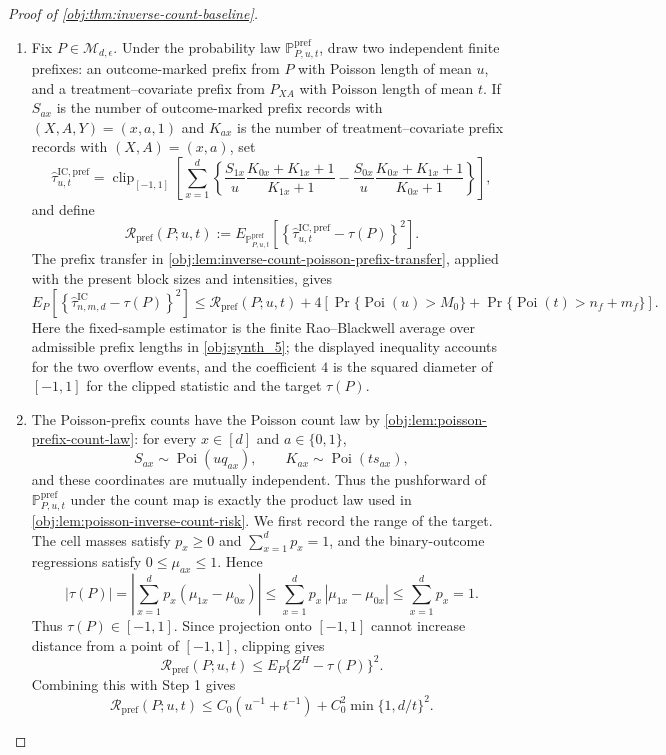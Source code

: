 \documentclass[11pt]{article}
\begin{document}
\begin{proof}[Proof of \cref{obj:thm:inverse-count-baseline}]
\begin{enumerate}
\item Fix \(P\in\mathcal M_{d,\epsilon}\).  Under the probability law \(\mathbb P^{\mathrm{pref}}_{P,u,t}\), draw two independent finite prefixes: an outcome-marked prefix from \(P\) with Poisson length of mean \(u\), and a treatment--covariate prefix from \(P_{XA}\) with Poisson length of mean \(t\).  If \(S_{ax}\) is the number of outcome-marked prefix records with \((X,A,Y)=(x,a,1)\) and \(K_{ax}\) is the number of treatment--covariate prefix records with \((X,A)=(x,a)\), set
\[
\widehat\tau^{\mathrm{IC,pref}}_{u,t}
=
\operatorname{clip}_{[-1,1]}
\left[
\sum_{x=1}^d
\left\{
\frac{S_{1x}}u\frac{K_{0x}+K_{1x}+1}{K_{1x}+1}
-
\frac{S_{0x}}u\frac{K_{0x}+K_{1x}+1}{K_{0x}+1}
\right\}
\right],
\]
and define
\[
\mathcal R_{\mathrm{pref}}(P;u,t)
:=
E_{\mathbb P^{\mathrm{pref}}_{P,u,t}}
\left[
\left\{
\widehat\tau^{\mathrm{IC,pref}}_{u,t}-\tau(P)
\right\}^2
\right].
\]
The prefix transfer in \cref{obj:lem:inverse-count-poisson-prefix-transfer}, applied with the present block sizes and intensities, gives
\[
E_P\!\left[
\left\{\widehat\tau^{\mathrm{IC}}_{n,m,d}-\tau(P)\right\}^2
\right]
\le
\mathcal R_{\mathrm{pref}}(P;u,t)
+
4\left[
\Pr\{\operatorname{Poi}(u)>M_0\}
+
\Pr\{\operatorname{Poi}(t)>n_f+m_f\}
\right].
\]
Here the fixed-sample estimator is the finite Rao--Blackwell average over admissible prefix lengths in \cref{obj:synth_5}; the displayed inequality accounts for the two overflow events, and the coefficient \(4\) is the squared diameter of \([-1,1]\) for the clipped statistic and the target \(\tau(P)\). %

\item The Poisson-prefix counts have the Poisson count law by \cref{obj:lem:poisson-prefix-count-law}: for every \(x\in[d]\) and \(a\in\{0,1\}\),
\[
S_{ax}\sim\operatorname{Poi}(u q_{ax}),
\qquad
K_{ax}\sim\operatorname{Poi}(t s_{ax}),
\]
and these coordinates are mutually independent.  Thus the pushforward of \(\mathbb P^{\mathrm{pref}}_{P,u,t}\) under the count map is exactly the product law used in \cref{obj:lem:poisson-inverse-count-risk}.  We first record the range of the target.  The cell masses satisfy \(p_x\ge0\) and \(\sum_{x=1}^d p_x=1\), and the binary-outcome regressions satisfy \(0\le\mu_{ax}\le1\).  Hence
\[
\left|\tau(P)\right|
=
\left|\sum_{x=1}^d p_x(\mu_{1x}-\mu_{0x})\right|
\le
\sum_{x=1}^d p_x\,|\mu_{1x}-\mu_{0x}|
\le
\sum_{x=1}^d p_x
=1 .
\]
Thus \(\tau(P)\in[-1,1]\).  Since projection onto \([-1,1]\) cannot increase distance from a point of \([-1,1]\), clipping gives
\[
\mathcal R_{\mathrm{pref}}(P;u,t)
\le
E_P\{Z^H-\tau(P)\}^2 .
\]
Combining this with Step 1 gives
\[
\mathcal R_{\mathrm{pref}}(P;u,t)
\le
C_0(u^{-1}+t^{-1})
+
C_0^2\min\{1,d/t\}^2 .
\]


\end{enumerate}
\end{proof}
\end{document}
